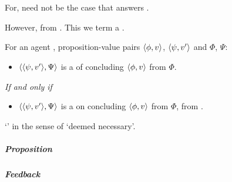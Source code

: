 \chapter{}
\label{cha:zS:sec:requs}


\section{}
\label{sec:requ3}

\begin{note}
  For, need not be the case that \ros{} answers \qWhy{}.

  However, \curb{} from \agpe{}.
  This we term a \requ{}.

  \begin{definition}[\requ{2}]
    \label{def:requ}
    For an agent \vAgent{}, proposition-value pairs \(\langle \phi, v \rangle\), \(\langle \psi, v' \rangle\) and  \(\Phi\), \(\Psi\):

    \begin{itemize}
    \item
      \(\langle \langle \psi, v' \rangle, \Psi \rangle\) is a \requ{} of concluding \(\langle \phi, v \rangle\) from \(\Phi\).
    \end{itemize}

    \emph{If and only if}

    \begin{itemize}
    \item
      \(\langle \langle \psi, v' \rangle, \Psi \rangle\) is a \curb{} on concluding \(\langle \phi, v \rangle\) from \(\Phi\), from .
    \end{itemize}
    \vspace{-\baselineskip}
  \end{definition}

  `' in the sense of `deemed necessary'.
\end{note}

\paragraph{Proposition}


\paragraph{Feedback}

